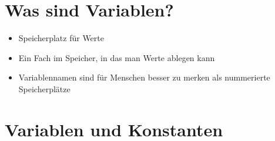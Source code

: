 \usepackage{blkarray}%




\subtitle{Kapitel 3: Daten Zwischenspeichern}
\maketitle

\section{Was sind Variablen?}
\begin{frame}[fragile]
    \slidehead
    \begin{itemize}[<+->]
        \item Speicherplatz für Werte
        \item Ein Fach im Speicher, in das man Werte ablegen kann
        \item Variablennamen sind für Menschen besser zu merken als nummerierte Speicherplätze
    \end{itemize}
\end{frame}

\section{Variablen und Konstanten}
